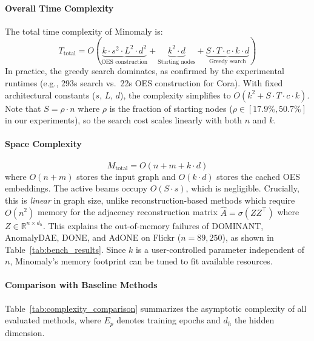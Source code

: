 \documentclass[pdflatex,sn-mathphys-num]{sn-jnl}%
\theoremstyle{thmstyleone}%
\theoremstyle{thmstyletwo}%
\theoremstyle{thmstylethree}%
\begin{document}
{\paragraph{Overall Time Complexity}
The total time complexity of Minomaly is:
\begin{equation}
\label{eq:total_complexity}
\boxed{T_{\text{total}} = O\!\left(\underbrace{k \cdot s^2 \cdot L^2 \cdot d^2}_{\text{OES construction}} + \underbrace{k^2 \cdot d}_{\text{Starting nodes}} + \underbrace{S \cdot T \cdot c \cdot k \cdot d}_{\text{Greedy search}}\right)}
\end{equation}
In practice, the greedy search dominates, as confirmed by the experimental runtimes (e.g., 293s search vs.\ 22s OES construction for Cora). With fixed architectural constants ($s$, $L$, $d$), the complexity simplifies to $O(k^2 + S \cdot T \cdot c \cdot k)$. Note that $S = \rho \cdot n$ where $\rho$ is the fraction of starting nodes ($\rho \in [17.9\%, 50.7\%]$ in our experiments), so the search cost scales linearly with both $n$ and $k$.

\paragraph{Space Complexity}
\begin{equation}
\label{eq:space_complexity}
M_{\text{total}} = O(n + m + k \cdot d)
\end{equation}
where $O(n + m)$ stores the input graph and $O(k \cdot d)$ stores the cached OES embeddings. The active beams occupy $O(S \cdot s)$, which is negligible. Crucially, this is \emph{linear} in graph size, unlike reconstruction-based methods which require $O(n^2)$ memory for the adjacency reconstruction matrix $\hat{A} = \sigma(ZZ^\top)$ where $Z \in \mathbb{R}^{n \times d_h}$. This explains the out-of-memory failures of DOMINANT, AnomalyDAE, DONE, and AdONE on Flickr ($n = 89{,}250$), as shown in Table~\ref{tab:bench_results}. Since $k$ is a user-controlled parameter independent of $n$, Minomaly's memory footprint can be tuned to fit available resources.

\paragraph{Comparison with Baseline Methods}
Table~\ref{tab:complexity_comparison} summarizes the asymptotic complexity of all evaluated methods, where $E_p$ denotes training epochs and $d_h$ the hidden dimension.

}
\end{document}
